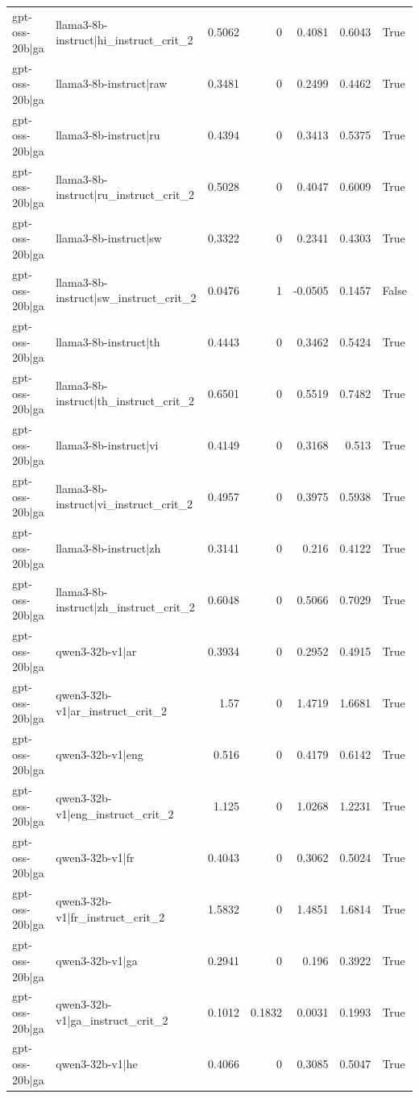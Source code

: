 \begin{table}
\begin{tabular}{l l r r r r l}
gpt-oss-20b|ga & llama3-8b-instruct|hi_instruct_crit_2 & 0.5062 & 0 & 0.4081 & 0.6043 & True \\
gpt-oss-20b|ga & llama3-8b-instruct|raw & 0.3481 & 0 & 0.2499 & 0.4462 & True \\
gpt-oss-20b|ga & llama3-8b-instruct|ru & 0.4394 & 0 & 0.3413 & 0.5375 & True \\
gpt-oss-20b|ga & llama3-8b-instruct|ru_instruct_crit_2 & 0.5028 & 0 & 0.4047 & 0.6009 & True \\
gpt-oss-20b|ga & llama3-8b-instruct|sw & 0.3322 & 0 & 0.2341 & 0.4303 & True \\
gpt-oss-20b|ga & llama3-8b-instruct|sw_instruct_crit_2 & 0.0476 & 1 & -0.0505 & 0.1457 & False \\
gpt-oss-20b|ga & llama3-8b-instruct|th & 0.4443 & 0 & 0.3462 & 0.5424 & True \\
gpt-oss-20b|ga & llama3-8b-instruct|th_instruct_crit_2 & 0.6501 & 0 & 0.5519 & 0.7482 & True \\
gpt-oss-20b|ga & llama3-8b-instruct|vi & 0.4149 & 0 & 0.3168 & 0.513 & True \\
gpt-oss-20b|ga & llama3-8b-instruct|vi_instruct_crit_2 & 0.4957 & 0 & 0.3975 & 0.5938 & True \\
gpt-oss-20b|ga & llama3-8b-instruct|zh & 0.3141 & 0 & 0.216 & 0.4122 & True \\
gpt-oss-20b|ga & llama3-8b-instruct|zh_instruct_crit_2 & 0.6048 & 0 & 0.5066 & 0.7029 & True \\
gpt-oss-20b|ga & qwen3-32b-v1|ar & 0.3934 & 0 & 0.2952 & 0.4915 & True \\
gpt-oss-20b|ga & qwen3-32b-v1|ar_instruct_crit_2 & 1.57 & 0 & 1.4719 & 1.6681 & True \\
gpt-oss-20b|ga & qwen3-32b-v1|eng & 0.516 & 0 & 0.4179 & 0.6142 & True \\
gpt-oss-20b|ga & qwen3-32b-v1|eng_instruct_crit_2 & 1.125 & 0 & 1.0268 & 1.2231 & True \\
gpt-oss-20b|ga & qwen3-32b-v1|fr & 0.4043 & 0 & 0.3062 & 0.5024 & True \\
gpt-oss-20b|ga & qwen3-32b-v1|fr_instruct_crit_2 & 1.5832 & 0 & 1.4851 & 1.6814 & True \\
gpt-oss-20b|ga & qwen3-32b-v1|ga & 0.2941 & 0 & 0.196 & 0.3922 & True \\
gpt-oss-20b|ga & qwen3-32b-v1|ga_instruct_crit_2 & 0.1012 & 0.1832 & 0.0031 & 0.1993 & True \\
gpt-oss-20b|ga & qwen3-32b-v1|he & 0.4066 & 0 & 0.3085 & 0.5047 & True \\

\end{tabular}
\end{table}

